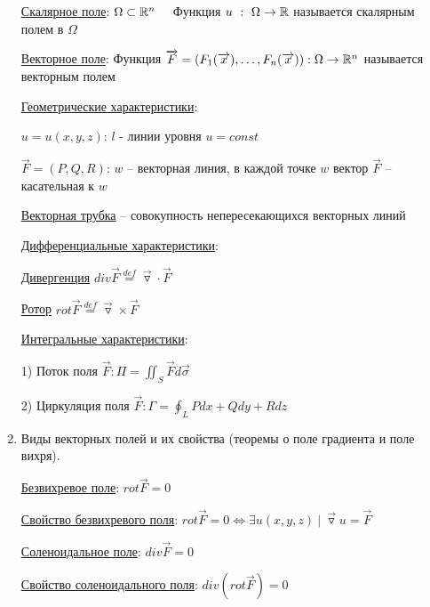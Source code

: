 \documentclass[12pt]{article}
\begin{document}
\begin{enumerate}
        \hyperlink{scalarfield}{Скалярное поле}: $\Omega \subset \mathbb{R}^n \quad$ Функция $u \ : \ \Omega \to \mathbb{R}$ называется скалярным полем в $\Omega$

        \hyperlink{vectorfield}{Векторное поле}: Функция $\overrightarrow{F} = (F_1(\overrightarrow{x}), \dots, F_n(\overrightarrow{x})) : \Omega \to \mathbb{R}^n$ называется векторным полем

        \hyperlink{scalarandvectorfieldgeometric}{Геометрические характеристики}:

        $u = u(x, y, z)$: $l$ - линии уровня $u = const$

        $\overrightarrow{F} = (P, Q, R)$: $w$ -- векторная линия, в каждой точке $w$ вектор $\overrightarrow{F}$ -- касательная к $w$

        \underline{Векторная трубка} -- совокупность непересекающихся векторных линий

        \hyperlink{differentialcharacteristics}{Дифференциальные характеристики}:

        \hyperlink{divergence}{Дивергенция} $div \overrightarrow{F} \stackrel{def}{=} \overrightarrow{\triangledown} \cdot \overrightarrow{F}$

        \hyperlink{rotor}{Ротор} $rot \overrightarrow{F} \stackrel{def}{=} \overrightarrow{\triangledown} \times \overrightarrow{F}$

        \hyperlink{integralcharacteristics}{Интегральные характеристики}:

        1) Поток поля $\overrightarrow{F}: \Pi = \iint_S \overrightarrow{F}d\overrightarrow{\sigma}$

        2) Циркуляция поля $\overrightarrow{F}: \Gamma = \oint_L Pdx + Qdy + Rdz$

        \item Виды векторных полей и их свойства (теоремы о поле градиента и поле вихря).

        \hyperlink{vectorfieldtypes}{Безвихревое поле}: $rot \overrightarrow{F} = 0$

        \hyperlink{irrotationalfieldproperty}{Свойство безвихревого поля}: $rot \overrightarrow{F} = 0 \Longleftrightarrow \exists u(x, y, z) \ | \ \overrightarrow{\triangledown}u = \overrightarrow{F}$

        \hyperlink{vectorfieldtypes}{Соленоидальное поле}: $div \overrightarrow{F} = 0$

        \hyperlink{solenoidalfieldproperty}{Свойство соленоидального поля}: $div (rot \overrightarrow{F}) = 0$


\end{enumerate}
\end{document}
